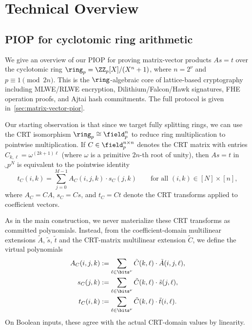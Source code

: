 \section{Technical Overview}
\subsection{PIOP for cyclotomic ring arithmetic}
\label{sec:tech-overview-ring}

We give an overview of our PIOP for proving matrix-vector products $As = t$ over the cyclotomic ring $\ring_p = \ZZ_p[X]/(X^n+1)$, where $n = 2^\nu$ and $p \equiv 1 \pmod{2n}$. This is the $\ring$-algebraic core of lattice-based cryptography including MLWE/RLWE encryption, Dilithium/Falcon/Hawk signatures, FHE operation proofs, and Ajtai hash commitments. The full protocol is given in~\cref{sec:matrix-vector-pior}.

Our starting observation is that since we target fully splitting rings, we can use the CRT isomorphism $\ring_p \cong \field_p^n$ to reduce ring multiplication to pointwise multiplication. If $C \in \field_p^{n \times n}$ denotes the CRT matrix with entries $C_{k,\ell} = \omega^{(2k+1)\ell}$ (where $\omega$ is a primitive $2n$-th root of unity), then $As = t$ in $\ring_p^N$ is equivalent to the pointwise identity
\begin{equation}\label{eq:overview-pointwise}
    t_C(i,k) = \sum_{j=0}^{M-1} A_C(i,j,k) \cdot s_C(j,k) \qquad \text{for all } (i,k) \in [N] \times [n],
\end{equation}
where $A_C = C A$, $s_C = Cs$, and $t_C = Ct$ denote the CRT transforms applied to coefficient vectors.

As in the main construction, we never materialize these CRT transforms as committed polynomials. Instead, from the coefficient-domain multilinear extensions $\tilde{A}$, $\tilde{s}$, $\tilde{t}$ and the CRT-matrix multilinear extension $\tilde{C}$, we define the virtual polynomials
\begin{align*}
    A_C(i,j,k) &:= \sum_{\ell \in \bits^\nu} \tilde{C}(k,\ell) \cdot \tilde{A}(i,j,\ell), \\
    s_C(j,k) &:= \sum_{\ell \in \bits^\nu} \tilde{C}(k,\ell) \cdot \tilde{s}(j,\ell), \\
    t_C(i,k) &:= \sum_{\ell \in \bits^\nu} \tilde{C}(k,\ell) \cdot \tilde{t}(i,\ell).
\end{align*}
On Boolean inputs, these agree with the actual CRT-domain values by linearity. 

